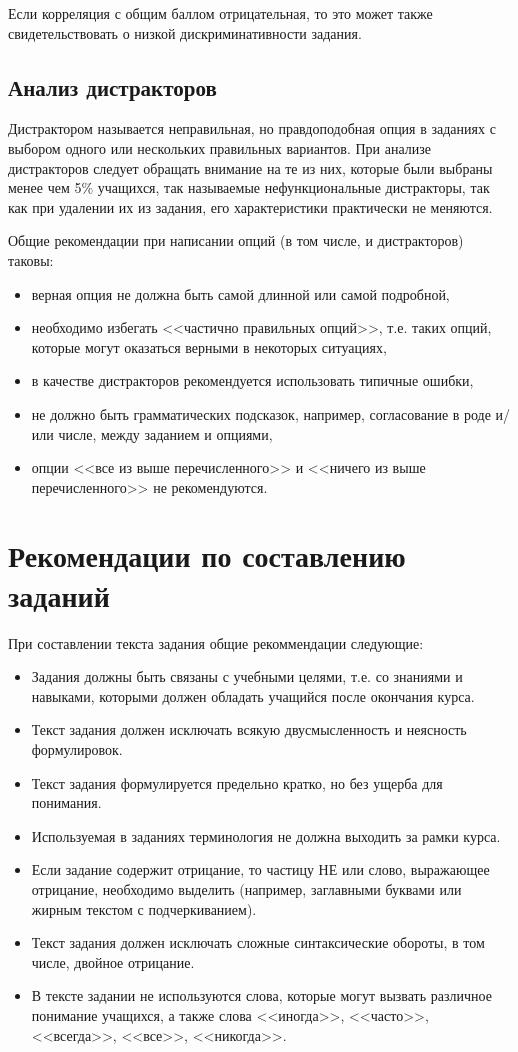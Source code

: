 Если корреляция с общим баллом отрицательная, то это может также свидетельствовать о низкой дискриминативности задания.


\section*{Анализ дистракторов}
Дистрактором называется неправильная, но правдоподобная опция в заданиях с выбором одного или нескольких правильных вариантов. При анализе дистракторов следует обращать внимание на те из них, которые были выбраны менее чем 5\% учащихся, так называемые нефункциональные дистракторы, так как при удалении их из задания, его характеристики практически не меняются.

Общие рекомендации при написании опций (в том числе, и дистракторов) таковы:
\begin{itemize}
\item верная опция не должна быть самой длинной или самой подробной,
\item необходимо избегать <<частично правильных опций>>, т.е. таких опций, которые могут оказаться верными в некоторых ситуациях,
\item в качестве дистракторов рекомендуется использовать типичные ошибки,
\item не должно быть грамматических подсказок, например, согласование в роде и/или числе, между заданием и опциями,
\item опции <<все из выше перечисленного>> и <<ничего из выше перечисленного>> не рекомендуются.
\end{itemize}


\chapter{Рекомендации по составлению заданий}

При составлении текста задания общие рекоммендации следующие:
\begin{itemize}
\item Задания должны быть связаны с учебными целями, т.е. со знаниями и навыками, которыми должен обладать учащийся после окончания курса.
\item Текст задания должен исключать всякую двусмысленность и неясность формулировок.
\item Текст задания формулируется предельно кратко, но без ущерба для понимания. 
\item Используемая в заданиях терминология не должна выходить за рамки курса.
\item Если задание содержит отрицание, то частицу НЕ или слово, выражающее отрицание, необходимо выделить (например, заглавными буквами или жирным текстом с подчеркиванием).
\item Текст задания должен исключать сложные синтаксические обороты, в том числе, двойное отрицание.
\item В тексте задании не используются слова, которые могут вызвать различное понимание учащихся, а также слова <<иногда>>, <<часто>>, <<всегда>>, <<все>>, <<никогда>>.
\end{itemize}

